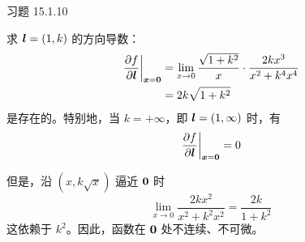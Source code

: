 \begin{problem}
    习题 15.1.10
    \begin{solution}
        求 $\boldsymbol{l} = (1, k)$ 的方向导数：
        $$
        \begin{aligned}
            \left. \pdv{f}{\boldsymbol{l}} \right|_{\boldsymbol{x} = \boldsymbol{0}} & = \lim_{x \to 0} \frac{\sqrt{1 + k^2}}{x} \cdot \frac{2 k x^3}{x^2 + k^4 x^4} \\
            & = 2k \sqrt{1 + k^2}
        \end{aligned}
        $$
        是存在的。特别地，当 $k = +\infty$，即 $\boldsymbol{l} = (1, \infty)$ 时，有
        $$
        \left. \pdv{f}{\boldsymbol{l}} \right|_{\boldsymbol{x} = \boldsymbol{0}} = 0
        $$

        但是，沿 $(x, k \sqrt{x})$ 逼近 $\boldsymbol{0}$ 时
        $$
        \lim_{x \to 0} \frac{2 k x^2}{x^2 + k^2 x^2} = \frac{2k}{1 + k^2}
        $$
        这依赖于 $k^2$。因此，函数在 $\boldsymbol{0}$ 处不连续、不可微。
    \end{solution}
\end{problem}
